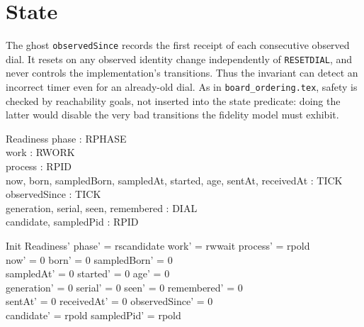 \documentclass[a4paper,10pt,fleqn]{article}
\begin{document}
\section{State}
The ghost \texttt{observedSince} records the first receipt of each consecutive
observed dial. It resets on any observed identity change independently of
\texttt{RESETDIAL}, and never controls the implementation's transitions. Thus
the invariant can detect an incorrect timer even for an already-old dial.
As in \texttt{board\_ordering.tex}, safety is checked by reachability goals,
not inserted into the state predicate: doing the latter would disable the very
bad transitions the fidelity model must exhibit.
\begin{schema}{Readiness}
  phase : RPHASE \\
  work : RWORK \\
  process : RPID \\
  now, born, sampledBorn, sampledAt, started, age, sentAt, receivedAt : TICK \\
  observedSince : TICK \\
  generation, serial, seen, remembered : DIAL \\
  candidate, sampledPid : RPID
\end{schema}
\begin{schema}{Init}
  Readiness'
\where
  phase' = rscandidate \land work' = rwwait \land process' = rpold \\
  now' = 0 \land born' = 0 \land sampledBorn' = 0 \\
  sampledAt' = 0 \land started' = 0 \land age' = 0 \\
  generation' = 0 \land serial' = 0 \land seen' = 0
    \land remembered' = 0 \\
  sentAt' = 0 \land receivedAt' = 0 \land observedSince' = 0 \\
  candidate' = rpold \land sampledPid' = rpold
\end{schema}
\end{document}

